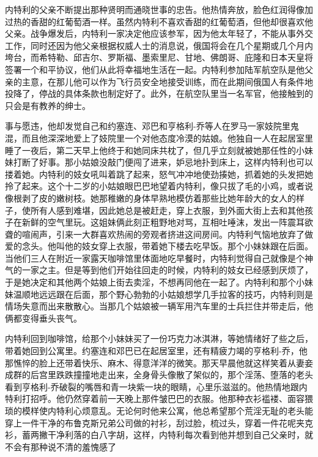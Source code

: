     内特利的父亲不断提出那种贤明而通晓世事的忠告。他热情奔放，脸色红润得像加过热的香甜的红葡萄酒一样。虽然内特利不喜欢香甜的红葡萄酒，但他却很喜欢他父亲。战争爆发后，内特利一家决定他应该参军，因为他太年轻了，不能从事外交工作，同时还因为他父亲根据权威人士的消息说，俄国将会在几个星期或几个月内垮台，而希特勒、邱吉尔、罗斯福、墨索里尼、甘地、佛朗哥、庇隆和日本天皇将签署一个和平协议，他们从此将幸福地生活在一起。内特利参加陆军航空队是他父亲的主意，在那儿他可以作为飞行员安全地接受训练，而在此期间俄国人有条件地投降了，停战的具体条款也制定好了。此外，在航空队里当一名军官，他接触到的只会是有教养的绅士。

    事与愿违，他却发觉自己和约塞连、邓巴和亨格利-乔等人在罗马一家妓院里鬼混，而且他深深地爱上了妓院里一个对他态度冷漠的姑娘。他独自一人在起居室里睡了一夜后，第二天早上他终于和她同床共枕了，但几乎立刻就被她那任性的小妹妹打断了好事。那小姑娘没敲门便闯了进来，妒忌地扑到床上，这样内特利也可以搂着她。内特利的妓女吼叫着跳了起来，怒气冲冲地使劲揍她，抓着她的头发把她拎了起来。这个十二岁的小姑娘眼巴巴地望着内特利，像只拔了毛的小鸡，或者说像根剥了皮的嫩树枝。她那稚嫩的身体早熟地模仿着那些比她年龄大的女人的样子，使所有人感到难堪，因此她总是被赶走，穿上衣服，到外面大街上去和其他孩子在新鲜的空气里玩。这姐妹俩此刻正粗野地对骂，互相吐唾沫，发出一阵震耳欲聋的喧闹声，引来一大群喜欢热闹的旁观者挤进这间房间。内特利气恼地放弃了做爱的念头。他叫他的妓女穿上衣服，带着她下楼去吃早饭。那个小妹妹跟在后面。当他们三人在附近一家露天咖啡馆里体面地吃早餐时，内特利觉得自己就像是个神气的一家之主。但是等到他们开始往回走的时候，内特利的妓女已经感到厌烦了，于是她决定和其他两个姑娘上街去卖淫，不想再同他在一起了。内特利和那个小妹妹温顺地远远跟在后面，那个野心勃勃的小姑娘想学几手拉客的技巧，内特利则是情场失意而出来散散心。当那几个姑娘被一辆军用汽车里的士兵拦住并带走后，他俩都变得垂头丧气。

    内特利回到咖啡馆，给那个小妹妹买了一份巧克力冰淇淋，等她情绪好了些之后，带着她回到公寓里。约塞连和邓巴已在起居室里，还有精疲力竭的亨格利-乔，他那憔悴的脸上还带着快乐、麻木、得意洋洋的微笑。那天早晨他就这样笑着从妻妾成群的后宫里跌跌撞撞地走出来，全身骨头像散了架似的，那个淫荡、堕落的老头看到亨格利-乔破裂的嘴唇和青一块紫一块的眼睛，心里乐滋滋的。他热情地跟内特利打招呼。他仍然穿着前一天晚上那件皱巴巴的衣服。他那种衣衫褴褛、面容猥琐的模样使内特利心烦意乱。无论何时他来公寓，他总希望那个荒淫无耻的老头能穿上一件干净的布鲁克斯兄弟公司做的衬衫，刮过脸，梳过头，穿着一件花呢夹克衫，蓄两撇干净利落的白八字胡，这样，内特利每次看到他并想到自己父亲时，就不会有那种说不清的羞愧感了
